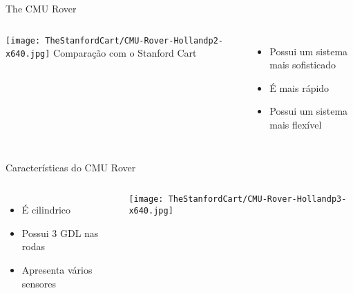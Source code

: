 \begin{frame}[t]{The CMU Rover}
    \begin{columns}
        \texttt{[image: TheStanfordCart/CMU-Rover-Hollandp2-x640.jpg]}
           Comparação com o Stanford Cart
            \begin{itemize} 
                \item Possui um sistema mais sofisticado
                \item É mais rápido
                \item Possui um sistema mais flexível
            \end{itemize}
            \end{columns}
\end{frame}

\begin{frame}[c]{Características do CMU Rover}
    \begin{columns}
        \begin{itemize} 
            \item É cilindrico
            \item Possui 3 GDL nas rodas
            \item Apresenta vários sensores
        \end{itemize}
            \centering
            \texttt{[image: TheStanfordCart/CMU-Rover-Hollandp3-x640.jpg]}
            \end{columns}
\end{frame}